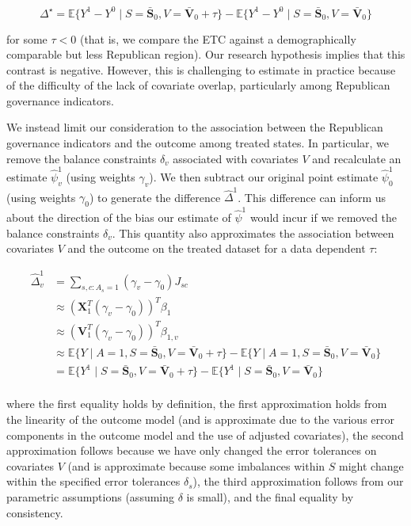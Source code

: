 \documentclass[aoas]{imsart}
\theoremstyle{plain}
\newcommand{\matr}[1]{\mathbf{#1}} %
\theoremstyle{remark}
\begin{document}
$$
\Delta^\star = \mathbb{E}\{Y^1 - Y^0 \mid S = \matr{\bar{S}}_0, V = \matr{\bar{V}}_0 + \tau\} - \mathbb{E}\{Y^1 - Y^0 \mid S = \matr{\bar{S}}_0, V = \matr{\bar{V}}_0\}
$$

for some $\tau < 0$ (that is, we compare the ETC against a demographically comparable but less Republican region). Our research hypothesis implies that this contrast is negative. However, this is challenging to estimate in practice because of the difficulty of the lack of covariate overlap, particularly among Republican governance indicators. 

We instead limit our consideration to the association between the Republican governance indicators and the outcome among treated states. In particular, we remove the balance constraints $\delta_v$ associated with covariates $V$ and recalculate an estimate $\hat{\psi}^1_v$ (using weights $\gamma_v$). We then subtract our original point estimate $\hat{\psi}^1_0$ (using weights $\gamma_0$) to generate the difference $\hat{\Delta}^1$. This difference can inform us about the direction of the bias our estimate of $\hat{\psi}^1$ would incur if we removed the balance constraints $\delta_v$. This quantity also approximates the association between covariates $V$ and the outcome on the treated dataset for a data dependent $\tau$:

\begin{align*}
    \hat{\Delta}^1_v &= \sum_{s, c: A_s = 1}(\gamma_v - \gamma_0)J_{sc} \\ 
    &\approx (\matr{X}_1^T(\gamma_v - \gamma_0))^T\beta_1 \\
    &\approx (\matr{V}_1^T(\gamma_v - \gamma_0))^T\beta_{1, v} \\
    &\approx \mathbb{E}\{Y \mid A = 1, S = \matr{\bar{S}}_0, V = \matr{\bar{V}}_0 + \tau\} - \mathbb{E}\{Y \mid A = 1, S = \matr{\bar{S}}_0, V = \matr{\bar{V}}_0\} \\
    &= \mathbb{E}\{Y^1 \mid S = \matr{\bar{S}}_0, V = \matr{\bar{V}}_0 + \tau\} - \mathbb{E}\{Y^1 \mid S = \matr{\bar{S}}_0, V = \matr{\bar{V}}_0\} \\
\end{align*}

where the first equality holds by definition, the first approximation holds from the linearity of the outcome model (and is approximate due to the various error components in the outcome model and the use of adjusted covariates), the second approximation follows because we have only changed the error tolerances on covariates $V$ (and is approximate because some imbalances within $S$ might change within the specified error tolerances $\delta_s$), the third approximation follows from our parametric assumptions (assuming $\delta$ is small), and the final equality by consistency. 
\end{document}
